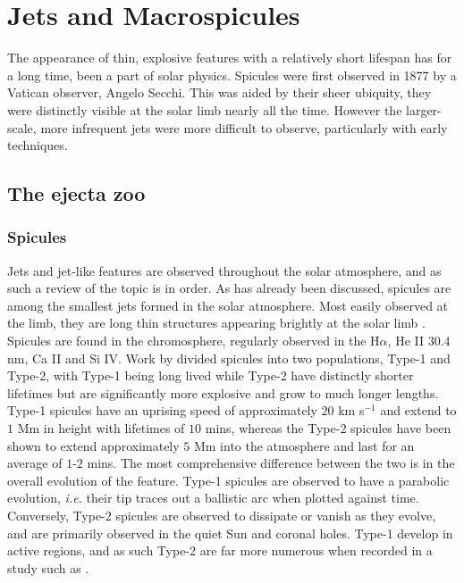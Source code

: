 



\chapter{Jets and Macrospicules}
\label{ch:2}



The appearance of thin, explosive features with a relatively short lifespan has for a long time, been a part of solar physics.
Spicules were first observed in 1877 by a Vatican observer, Angelo Secchi.
This was aided by their sheer ubiquity, they were distinctly visible at the solar limb nearly all the time.
However the larger-scale, more infrequent jets were more difficult to observe, particularly with early techniques.

\section{The ejecta zoo}


\subsection{Spicules}
Jets and jet-like features are observed throughout the solar atmosphere, and as such a review of the topic is in order.
As has already been discussed, spicules are among the smallest jets formed in the solar atmosphere. 
Most easily observed at the limb, they are long thin structures appearing brightly at the solar limb \cite{Beckers1972}.
Spicules are found in the chromosphere, regularly observed in the H$\alpha$, He II $30.4$ nm, Ca II and Si IV.
Work by \cite{DePontieu2007} divided spicules into two populations, Type-1 and Type-2, with Type-1 being long lived while Type-2 have distinctly shorter lifetimes but are significantly more explosive and grow to much longer lengths.
Type-1 spicules have an uprising speed of approximately $20$ km s$^{-1}$ and extend to $1$ Mm in height with lifetimes of $10$ mins, whereas the Type-2 spicules have been shown to extend approximately $5$ Mm into the atmosphere and last for an average of $1$-$2$ mins. 
The most comprehensive difference between the two is in the overall evolution of the feature.
Type-1 spicules are observed to have a parabolic evolution, \emph{i.e.} their tip traces out a ballistic arc when plotted against time.
Conversely, Type-2 spicules are observed to dissipate or vanish as they evolve, and are primarily observed in the quiet Sun and coronal holes.
Type-1 develop in active regions, and as such Type-2 are far more numerous when recorded in a study such as \cite{Pereira2012}.

